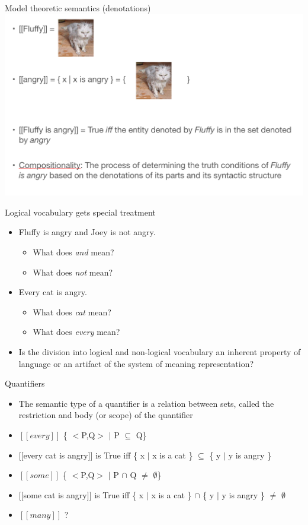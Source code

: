 \documentclass{beamer}
\begin{document}
\begin{frame}{Model theoretic semantics (denotations)}
  \includegraphics[width=\textwidth]{figures/cats2}
\end{frame}

\begin{frame}{Logical vocabulary gets special treatment}
  \begin{itemize}
  \item Fluffy is angry and Joey is not angry.
    \begin{itemize}
    \item What does {\it and} mean?
    \item What does {\it not} mean?
    \end{itemize}
  \item Every cat is angry.
    \begin{itemize}
    \item What does {\it cat} mean?  
    \item What does {\it every} mean?
    \end{itemize}
  \item Is the division into logical and non-logical vocabulary an
    inherent property of language or an artifact of the system of
    meaning representation?
  \end{itemize}
\end{frame}

\begin{frame}{Quantifiers}
  \begin{itemize}
  \item The semantic type of a quantifier is a relation between sets,
    called the restriction and body (or scope) of the quantifier
  \item $[\![every]\!]$ \{ $<$P,Q$>$ $\vert$ P $\subseteq$ Q\}
  \item $[\![$every cat is angry$]\!]$ is True iff 
    \{ x $\vert$ x is a cat \} $\subseteq$ \{ y $\vert$ y is angry \}
  \item $[\![some]\!]$ \{ $<$P,Q$>$ $\vert$ P $\cap$ Q $\neq$ $\emptyset$\}
  \item $[\![$some cat is angry$]\!]$ is True iff
    \{ x $\vert$ x is a cat \} $\cap$ \{ y $\vert$ y is angry \} $\neq$ $\emptyset$
  \item $[\![many]\!]$ ?
  \end{itemize}
\end{frame}
\end{document}
